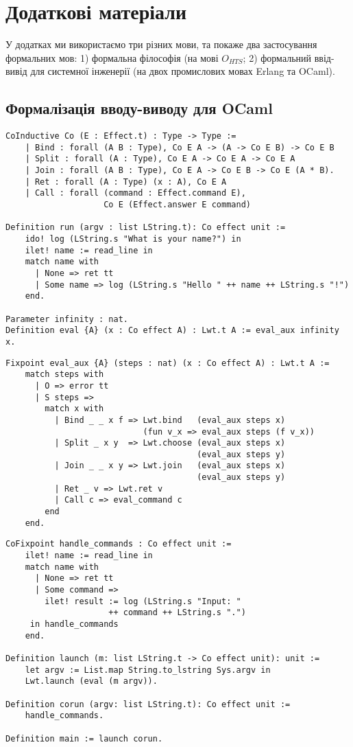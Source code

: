 \chapter{Додаткові матеріали}

У додатках ми використаємо три різних мови, та покаже два застосування
формальних мов: 1) формальна філософія (на мові $O_{HTS}$; 2) формальний ввід-вивід для
системної інженерії (на двох промислових мовах Erlang та OCaml).

\section{Формалізація вводу-виводу для OCaml}

\begin{lstlisting}
CoInductive Co (E : Effect.t) : Type -> Type :=
    | Bind : forall (A B : Type), Co E A -> (A -> Co E B) -> Co E B
    | Split : forall (A : Type), Co E A -> Co E A -> Co E A
    | Join : forall (A B : Type), Co E A -> Co E B -> Co E (A * B).
    | Ret : forall (A : Type) (x : A), Co E A
    | Call : forall (command : Effect.command E),
                    Co E (Effect.answer E command)

Definition run (argv : list LString.t): Co effect unit :=
    ido! log (LString.s "What is your name?") in
    ilet! name := read_line in
    match name with
      | None => ret tt
      | Some name => log (LString.s "Hello " ++ name ++ LString.s "!")
    end.

Parameter infinity : nat.
Definition eval {A} (x : Co effect A) : Lwt.t A := eval_aux infinity x.
\end{lstlisting}

\newpage
\begin{lstlisting}
Fixpoint eval_aux {A} (steps : nat) (x : Co effect A) : Lwt.t A :=
    match steps with
      | O => error tt
      | S steps =>
        match x with
          | Bind _ _ x f => Lwt.bind   (eval_aux steps x)
                            (fun v_x => eval_aux steps (f v_x))
          | Split _ x y  => Lwt.choose (eval_aux steps x)
                                       (eval_aux steps y)
          | Join _ _ x y => Lwt.join   (eval_aux steps x)
                                       (eval_aux steps y)
          | Ret _ v => Lwt.ret v
          | Call c => eval_command c
        end
    end.
\end{lstlisting}

\begin{lstlisting}
CoFixpoint handle_commands : Co effect unit :=
    ilet! name := read_line in
    match name with
      | None => ret tt
      | Some command =>
        ilet! result := log (LString.s "Input: "
                     ++ command ++ LString.s ".")
     in handle_commands
    end.

Definition launch (m: list LString.t -> Co effect unit): unit :=
    let argv := List.map String.to_lstring Sys.argv in
    Lwt.launch (eval (m argv)).

Definition corun (argv: list LString.t): Co effect unit :=
    handle_commands.

Definition main := launch corun.
\end{lstlisting}

